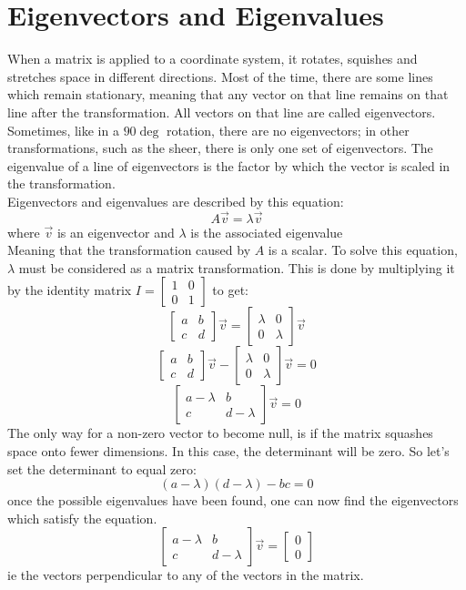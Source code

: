 \documentclass{article}
\begin{document}
\section{Eigenvectors and Eigenvalues}
When a matrix is applied to a coordinate system, it rotates, squishes and stretches space in different directions. Most of the time, there are some lines which remain stationary, meaning that any vector on that line remains on that line after the transformation. All vectors on that line are called eigenvectors. Sometimes, like in a $90\deg$ rotation, there are no eigenvectors; in other transformations, such as the sheer, there is only one set of eigenvectors. The eigenvalue of a line of eigenvectors is the factor by which the vector is scaled in the transformation.\\
Eigenvectors and eigenvalues are described by this equation:
\[A\vec{v} = \lambda\vec{v}
\]
where $\vec{v}$ is an eigenvector and $\lambda$ is the associated eigenvalue\\
Meaning that the transformation caused by $A$ is a scalar. To solve this equation, $\lambda$ must be considered as a matrix transformation. This is done by multiplying it by the identity matrix $I = \begin{bmatrix}
    1&0\\
    0&1
\end{bmatrix}$ to get:
\[\begin{bmatrix}
    a&b\\
    c&d
\end{bmatrix}\vec{v} = \begin{bmatrix}
    \lambda&0\\
    0&\lambda
\end{bmatrix}\vec{v}
\]
\[\begin{bmatrix}
    a&b\\
    c&d
\end{bmatrix}\vec{v} - \begin{bmatrix}
    \lambda&0\\
    0&\lambda
\end{bmatrix}\vec{v} = 0
\]
\[\begin{bmatrix}
    a - \lambda&b\\
    c&d - \lambda
\end{bmatrix}\vec{v} = 0
\]
The only way for a non-zero vector to become null, is if the matrix squashes space onto fewer dimensions. In this case, the determinant will be zero. So let's set the determinant to equal zero:
\[
(a - \lambda)(d - \lambda) - bc = 0
\]
once the possible eigenvalues have been found, one can now find the eigenvectors which satisfy the equation.
\[
\begin{bmatrix}
    a - \lambda&b\\
    c&d - \lambda
\end{bmatrix}\vec{v} = \begin{bmatrix}
    0\\
    0
\end{bmatrix}
\]
ie the vectors perpendicular to any of the vectors in the matrix.
\end{document}
